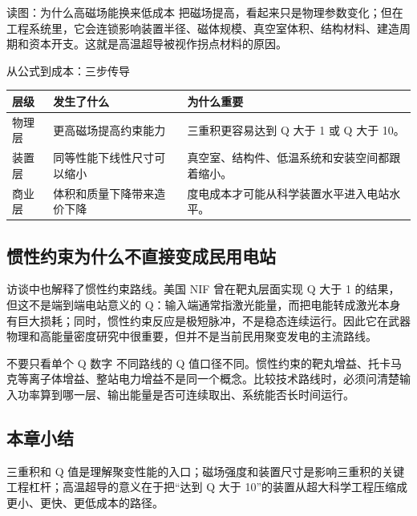 \begin{knowledgebox}{读图：为什么高磁场能换来低成本}
把磁场提高，看起来只是物理参数变化；但在工程系统里，它会连锁影响装置半径、磁体规模、真空室体积、结构材料、建造周期和资本开支。这就是高温超导被视作拐点材料的原因。
\end{knowledgebox}

\begin{knowledgebox}{从公式到成本：三步传导}
\begin{tabularx}{\textwidth}{p{}p{}X}
\toprule
层级 & 发生了什么 & 为什么重要 \\
\midrule
物理层 & 更高磁场提高约束能力 & 三重积更容易达到 Q 大于 1 或 Q 大于 10。 \\
装置层 & 同等性能下线性尺寸可以缩小 & 真空室、结构件、低温系统和安装空间都跟着缩小。 \\
商业层 & 体积和质量下降带来造价下降 & 度电成本才可能从科学装置水平进入电站水平。 \\
\bottomrule
\end{tabularx}
\end{knowledgebox}

\subsection{惯性约束为什么不直接变成民用电站}

访谈中也解释了惯性约束路线。美国 NIF 曾在靶丸层面实现 Q 大于 1 的结果，但这不是端到端电站意义的 Q：输入端通常指激光能量，而把电能转成激光本身有巨大损耗；同时，惯性约束反应是极短脉冲，不是稳态连续运行。因此它在武器物理和高能量密度研究中很重要，但并不是当前民用聚变发电的主流路线。

\begin{warningbox}{不要只看单个 Q 数字}
不同路线的 Q 值口径不同。惯性约束的靶丸增益、托卡马克等离子体增益、整站电力增益不是同一个概念。比较技术路线时，必须问清楚输入功率算到哪一层、输出能量是否可连续取出、系统能否长时间运行。
\end{warningbox}

\subsection{本章小结}

三重积和 Q 值是理解聚变性能的入口；磁场强度和装置尺寸是影响三重积的关键工程杠杆；高温超导的意义在于把“达到 Q 大于 10”的装置从超大科学工程压缩成更小、更快、更低成本的路径。

